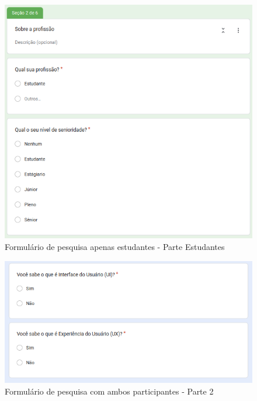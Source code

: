 \begin{figure}[!h]
	\begin{center}
	    \includegraphics[scale=0.6]{figs/Form/03.png}
	\end{center}
	\caption{\label{AP_PEs}Formulário de pesquisa apenas estudantes - Parte Estudantes}
\end{figure}

\begin{figure}[!h]
	\begin{center}
	    \includegraphics[scale=0.6]{figs/Form/04.png}
	\end{center}
	\caption{\label{AP_P02}Formulário de pesquisa com ambos participantes - Parte 2}
\end{figure}

\newpage

